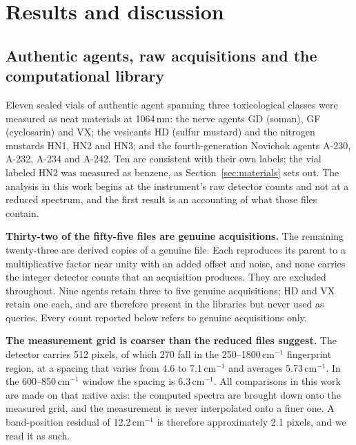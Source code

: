 \documentclass[review,12pt]{elsarticle}
\newcommand*\wn{\ensuremath{\text{cm}^{-1}}}
\begin{document}

\section{Results and discussion}
\subsection{Authentic agents, raw acquisitions and the computational library}

Eleven sealed vials of authentic agent spanning three toxicological classes were
measured as neat materials at 1064\,nm: the nerve agents GD (soman), GF (cyclosarin)
and VX; the vesicants HD (sulfur mustard) and the nitrogen mustards HN1, HN2 and HN3;
and the fourth-generation Novichok agents A-230, A-232, A-234 and
A-242.\cite{kloske2019novichoks,noga2023novichoks} Ten are consistent with their own labels; the vial labeled HN2 was measured as benzene, as Section~\ref{sec:materials} sets out. The analysis in this work begins at
the instrument's raw detector counts and not at a reduced spectrum, and the first
result is an accounting of what those files contain.

\textbf{Thirty-two of the fifty-five files are genuine acquisitions.} The remaining
twenty-three are derived copies of a genuine file. Each reproduces its parent to a
multiplicative factor near unity with an added offset and noise, and none carries the
integer detector counts that an acquisition produces. They are excluded throughout.
Nine agents retain three to five genuine acquisitions; HD and VX retain one each, and
are therefore present in the libraries but never used as queries. Every count reported
below refers to genuine acquisitions only.

\textbf{The measurement grid is coarser than the reduced files suggest.} The detector
carries 512 pixels, of which 270 fall in the 250--1800\,\wn{} fingerprint region, at a
spacing that varies from 4.6 to 7.1\,\wn{} and averages 5.73\,\wn{}. In the
600--850\,\wn{} window the spacing is 6.3\,\wn{}. All comparisons in this work are made
on that native axis: the computed spectra are brought down onto the measured grid, and
the measurement is never interpolated onto a finer one. A band-position residual of
12.2\,\wn{} is therefore approximately 2.1 pixels, and we read it as such.
\end{document}
